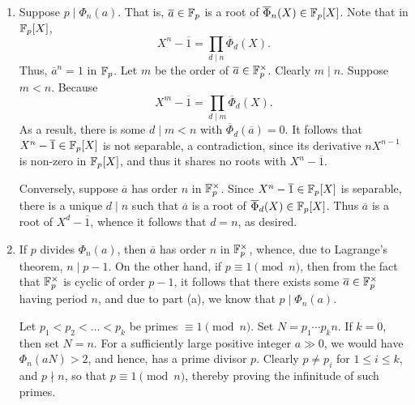 \setcounter{exercise}{20}
\begin{exercise}
\begin{enumerate}[label=(\alph*)]
    \item Suppose $p\mid\Phi_n(a)$. That is, $\overline a\in\mathbb{F}_p$ is a root of $\overline\Phi_n(X)\in\mathbb{F}_p[X]$. Note that in $\mathbb{F}_p[X]$,
    \begin{equation*}
        X^n - \overline 1 = \prod_{d\mid n}\overline\Phi_d(X).
    \end{equation*}
    Thus, $\overline a^n = 1$ in $\mathbb{F}_p$. Let $m$ be the order of $\overline a\in\mathbb{F}_p^\times$. Clearly $m\mid n$. Suppose $m < n$. Because 
    \begin{equation*}
        X^m - \overline 1 = \prod_{d\mid m}\overline\Phi_d(X).
    \end{equation*}
    As a result, there is some $d\mid m < n$ with $\overline\Phi_d(\overline a) = 0$. It follows that $X^n - \overline 1\in\mathbb{F}_p[X]$ is not separable, a contradiction, since its derivative $nX^{n - 1}$ is non-zero in $\mathbb{F}_p[X]$, and thus it shares no roots with $X^n - \overline 1$.

    Conversely, suppose $\overline a$ has order $n$ in $\mathbb{F}_p^\times$. Since $X^{n} - \overline 1\in\mathbb{F}_{p}[X]$ is separable, there is a unique $d\mid n$ such that $\overline a$ is a root of $\overline\Phi_d(X)\in\mathbb{F}_p[X]$. Thus $\overline a$ is a root of $X^d - \overline 1$, whence it follows that $d = n$, as desired. 

    \item If $p$ divides $\Phi_n(a)$, then $\overline a$ has order $n$ in $\mathbb{F}_p^\times$, whence, due to Lagrange's theorem, $n\mid p - 1$. On the other hand, if $p\equiv 1\pmod{n}$, then from the fact that $\mathbb{F}_p^\times$ is cyclic of order $p - 1$, it follows that there exists some $\overline a\in\mathbb{F}_p^\times$ having period $n$, and due to part (a), we know that $p\mid\Phi_n(a)$.

    Let $p_1 < p_2 < \dots < p_k$ be primes $\equiv 1\pmod n$. Set $N = p_1\cdots p_kn$. If $k = 0$, then set $N = n$. For a sufficiently large positive integer $a\gg 0$, we would have $\Phi_n(aN) > 2$, and hence, has a prime divisor $p$. Clearly $p\ne p_i$ for $1\le i\le k$, and $p\nmid n$, so that $p\equiv 1\pmod n$, thereby proving the infinitude of such primes.
\end{enumerate}
\end{exercise}

